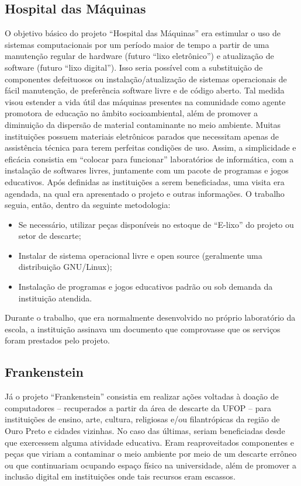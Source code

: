 \documentclass[a4paper]{ifacconf}
\begin{document}
\subsection{Hospital das Máquinas}
O objetivo básico do projeto ``Hospital das Máquinas'' era estimular o uso de sistemas computacionais por um período maior de tempo a partir de uma manutenção regular de hardware (futuro “lixo eletrônico”) e atualização de software (futuro “lixo digital”). Isso seria possível com a substituição de componentes defeituosos ou instalação/atualização de sistemas operacionais de fácil manutenção, de preferência software livre e de código aberto. Tal medida visou estender a vida útil das máquinas presentes na comunidade como agente promotora de educação no âmbito socioambiental, além de promover a diminuição da dispersão de material contaminante no meio ambiente. Muitas instituições possuem materiais eletrônicos parados que necessitam apenas de assistência técnica para terem perfeitas condições de uso. Assim, a simplicidade e eficácia consistia em ``colocar para funcionar'' laboratórios de informática, com a instalação de softwares livres, juntamente com um pacote de programas e jogos educativos. Após definidas as instituições a serem beneficiadas, uma visita era agendada, na qual era apresentado o projeto e outras informações. O trabalho seguia, então, dentro da seguinte metodologia:
\begin{itemize}
	\item Se necessário, utilizar peças disponíveis no estoque de ``E-lixo'' do projeto ou setor de descarte;
	\item Instalar de sistema operacional livre e open source (geralmente uma distribuição GNU/Linux);
	\item Instalação de programas e jogos educativos padrão ou sob demanda da instituição atendida.
\end{itemize}

Durante o trabalho, que era normalmente desenvolvido no próprio laboratório da escola, a instituição assinava um documento que comprovasse que os serviços foram prestados pelo projeto.

\subsection{Frankenstein}
Já o projeto ``Frankenstein'' consistia em realizar ações voltadas à doação de computadores – recuperados a partir da área de descarte da UFOP – para instituições de ensino, arte, cultura, religiosas e/ou filantrópicas da região de Ouro Preto e cidades vizinhas. No caso das últimas, seriam beneficiadas desde que exercessem alguma atividade educativa. Eram reaproveitados componentes e peças que viriam a contaminar o meio ambiente por meio de um descarte errôneo ou que continuariam ocupando espaço físico na universidade, além de promover a inclusão digital em instituições onde tais recursos eram escassos. 
\end{document}
